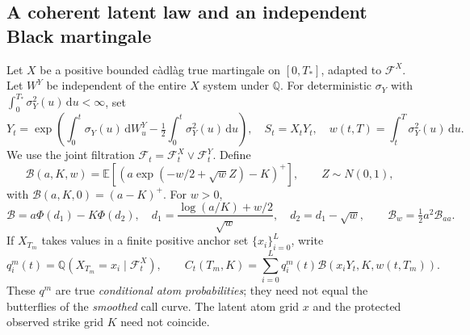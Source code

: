 \documentclass[11pt,a4paper]{article}
\numberwithin{equation}{section}
\theoremstyle{definition}\newtheorem{definition}[theorem]{Definition}
\theoremstyle{remark}\newtheorem{remark}[theorem]{Remark}
\newcommand{\Q}{\mathbb Q}\newcommand{\Pp}{\mathbb P}
\newcommand{\E}{\mathbb E}\newcommand{\R}{\mathbb R}
\newcommand{\F}{\mathcal F}\newcommand{\G}{\mathcal G}
\newcommand{\dd}{\,\mathrm d}\newcommand{\dt}{\,\mathrm dt}
\newcommand{\Black}{\mathcal B}\newcommand{\LC}{\mathcal L}
\begin{document}
\subsection{A coherent latent law and an independent Black martingale}
Let $X$ be a positive bounded c\`adl\`ag true martingale on $[0,T_*]$, adapted to $\F^X$. Let $W^Y$ be independent of the entire $X$ system under $\Q$. For deterministic $\sigma_Y$ with $\int_0^{T_*}\sigma_Y^2(u)\dd u<\infty$, set
\begin{equation}
 Y_t=\exp\left(\int_0^t\sigma_Y(u)\dd W_u^Y-\tfrac12\int_0^t\sigma_Y^2(u)\dd u\right),
 \quad S_t=X_tY_t,\quad w(t,T)=\int_t^T\sigma_Y^2(u)\dd u.
 \label{eq:xy}
\end{equation}
We use the joint filtration $\F_t=\F_t^X\vee\F_t^Y$. Define
\begin{equation}
 \Black(a,K,w)=\E[(a\exp(-w/2+\sqrt w Z)-K)^+],\qquad Z\sim N(0,1),
 \label{eq:black}
\end{equation}
with $\Black(a,K,0)=(a-K)^+$. For $w>0$,
\[
 \Black=a\Phi(d_1)-K\Phi(d_2),\quad
 d_1=\frac{\log(a/K)+w/2}{\sqrt w},\quad d_2=d_1-\sqrt w,
 \qquad \Black_w=\tfrac12a^2\Black_{aa}.
\]
If $X_{T_m}$ takes values in a finite positive anchor set $\{x_i\}_{i=0}^{L}$, write
\begin{equation}
 q_i^m(t)=\Q(X_{T_m}=x_i\mid\F_t^X),\qquad
 C_t(T_m,K)=\sum_{i=0}^{L}q_i^m(t)\Black(x_iY_t,K,w(t,T_m)).
 \label{eq:product-price}
\end{equation}
These $q^m$ are true \emph{conditional atom probabilities}; they need not equal the butterflies of the \emph{smoothed} call curve. The latent atom grid $x$ and the protected observed strike grid $K$ need not coincide.
\end{document}
